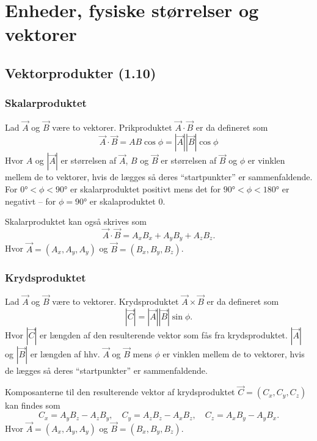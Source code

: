 \section{Enheder, fysiske størrelser og vektorer}

\subsection{Vektorprodukter (1.10)}

\subsubsection{Skalarproduktet}
Lad $\Vec{A}$ og $\Vec{B}$ være to vektorer. Prikproduktet $\Vec{A} \cdot \Vec{B}$ er da defineret som
\[
\Vec{A} \cdot \Vec{B} = AB \cos\phi = \left| \Vec{A} \right| \left| \Vec{B} \right| \cos\phi
\]
Hvor $A$ og $|\Vec{A}|$ er størrelsen af $\Vec{A}$, $B$ og $\Vec{B}$ er størrelsen af $\Vec{B}$ og $\phi$ er vinklen mellem de to vektorer, hvis de lægges så deres ``startpunkter'' er sammenfaldende. For $\ang{0} < \phi < \ang{90}$ er skalarproduktet positivt mens det for $\ang{90} < \phi < \ang{180}$ er negativt -- for $\phi = \ang{90}$ er skalaproduktet 0. 

Skalarproduktet kan også skrives som
\[ 
\Vec{A} \cdot \Vec{B} = A_xB_x + A_yB_y + A_zB_z
.\]
Hvor $\Vec{A} = (A_x, A_y, A_y)$ og $\Vec{B} = (B_x, B_y, B_z)$.

\subsubsection{Krydsproduktet}
Lad $\Vec{A}$ og $\Vec{B}$ være to vektorer. Krydsproduktet $\Vec{A} \times \Vec{B}$ er da defineret som
\[ 
\left| \Vec{C} \right| = \left| \Vec{A} \right| \left| \Vec{B} \right| \sin\phi 
.\]
Hvor $\left| \Vec{C} \right|$ er længden af den resulterende vektor som fås fra krydsproduktet. $\left| \Vec{A} \right|$ og $\left| \Vec{B} \right|$ er længden af hhv. $\Vec{A}$ og $\Vec{B}$ mens $\phi$ er vinklen mellem de to vektorer, hvis de lægges så deres ``startpunkter'' er sammenfaldende. 

Komposanterne til den resulterende vektor af krydsproduktet $\Vec{C} = (C_x, C_y, C_z)$ kan findes som
\[ 
C_x = A_yB_z - A_zB_y, \quad C_y = A_zB_z - A_xB_z, \quad C_z = A_xB_y - A_yB_x
.\]
Hvor $\Vec{A} = (A_x, A_y, A_y)$ og $\Vec{B} = (B_x, B_y, B_z)$.
